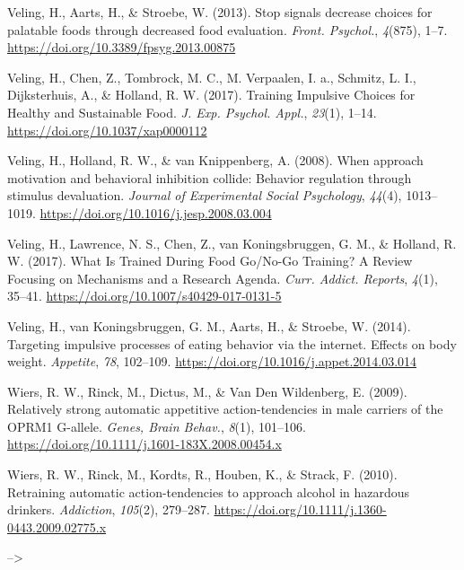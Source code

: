 \documentclass[man,floatsintext]{apa6}
\begin{document}
\hypertarget{ref-veling_stop_2013}{}
Veling, H., Aarts, H., \& Stroebe, W. (2013). Stop signals decrease
choices for palatable foods through decreased food evaluation.
\emph{Front. Psychol.}, \emph{4}(875), 1--7.
\url{https://doi.org/10.3389/fpsyg.2013.00875}

\hypertarget{ref-veling_training_2017-1}{}
Veling, H., Chen, Z., Tombrock, M. C., M. Verpaalen, I. a., Schmitz, L.
I., Dijksterhuis, A., \& Holland, R. W. (2017). Training Impulsive
Choices for Healthy and Sustainable Food. \emph{J. Exp. Psychol. Appl.},
\emph{23}(1), 1--14. \url{https://doi.org/10.1037/xap0000112}

\hypertarget{ref-veling_when_2008}{}
Veling, H., Holland, R. W., \& van Knippenberg, A. (2008). When approach
motivation and behavioral inhibition collide: Behavior regulation
through stimulus devaluation. \emph{Journal of Experimental Social
Psychology}, \emph{44}(4), 1013--1019.
\url{https://doi.org/10.1016/j.jesp.2008.03.004}

\hypertarget{ref-veling_what_2017}{}
Veling, H., Lawrence, N. S., Chen, Z., van Koningsbruggen, G. M., \&
Holland, R. W. (2017). What Is Trained During Food Go/No-Go Training? A
Review Focusing on Mechanisms and a Research Agenda. \emph{Curr. Addict.
Reports}, \emph{4}(1), 35--41.
\url{https://doi.org/10.1007/s40429-017-0131-5}

\hypertarget{ref-veling_targeting_2014}{}
Veling, H., van Koningsbruggen, G. M., Aarts, H., \& Stroebe, W. (2014).
Targeting impulsive processes of eating behavior via the internet.
Effects on body weight. \emph{Appetite}, \emph{78}, 102--109.
\url{https://doi.org/10.1016/j.appet.2014.03.014}

\hypertarget{ref-wiers_relatively_2009}{}
Wiers, R. W., Rinck, M., Dictus, M., \& Van Den Wildenberg, E. (2009).
Relatively strong automatic appetitive action-tendencies in male
carriers of the OPRM1 G-allele. \emph{Genes, Brain Behav.}, \emph{8}(1),
101--106. \url{https://doi.org/10.1111/j.1601-183X.2008.00454.x}

\hypertarget{ref-wiers_retraining_2010}{}
Wiers, R. W., Rinck, M., Kordts, R., Houben, K., \& Strack, F. (2010).
Retraining automatic action-tendencies to approach alcohol in hazardous
drinkers. \emph{Addiction}, \emph{105}(2), 279--287.
\url{https://doi.org/10.1111/j.1360-0443.2009.02775.x}

\endgroup --\textgreater{}
\end{document}
